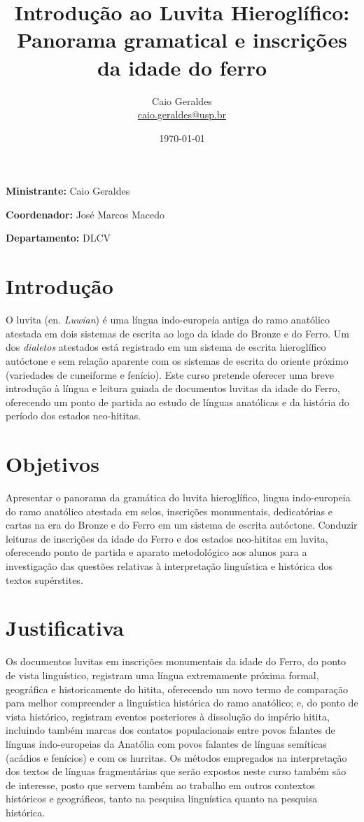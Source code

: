 \documentclass[article,12pt]{memoir}
\title{Introdução ao Luvita Hieroglífico:\\\large Panorama gramatical e inscrições da idade do ferro}
\author{Caio Geraldes\\\url{caio.geraldes@usp.br}}
\date{\today}
\begin{document}
\maketitle

\noindent\textbf{Ministrante:} Caio Geraldes

\noindent\textbf{Coordenador:} José Marcos Macedo

\noindent\textbf{Departamento:} DLCV

\chapter{Introdução}

O luvita (en. \emph{Luwian}) é uma língua indo-europeia antiga do ramo
anatólico atestada em dois sistemas de escrita ao logo da idade do
Bronze e do Ferro. Um dos \emph{dialetos} atestados está registrado em
um sistema de escrita hieroglífico autóctone e sem relação aparente com
os sistemas de escrita do oriente próximo (variedades de cuneiforme e
fenício). Este curso pretende oferecer uma breve introdução à língua e
leitura guiada de documentos luvitas da idade do Ferro, oferecendo um
ponto de partida ao estudo de línguas anatólicas e da história do
período dos estados neo-hititas.

\chapter{Objetivos}

Apresentar o panorama da gramática do luvita hieroglífico, lingua
indo-europeia do ramo anatólico atestada em selos, inscrições
monumentais, dedicatórias e cartas na era do Bronze e do Ferro em um
sistema de escrita autóctone. Conduzir leituras de inscrições da idade
do Ferro e dos estados neo-hititas em luvita, oferecendo ponto de
partida e aparato metodológico aos alunos para a investigação das
questões relativas à interpretação linguística e histórica dos textos
supérstites.

\chapter{Justificativa}

Os documentos luvitas em inscrições monumentais da idade do Ferro, do
ponto de vista linguístico, registram uma língua extremamente próxima
formal, geográfica e historicamente do hitita, oferecendo um novo termo
de comparação para melhor compreender a linguística histórica do ramo
anatólico; e, do ponto de vista histórico, registram eventos posteriores
à dissolução do império hitita, incluindo também marcas dos contatos
populacionais entre povos falantes de línguas indo-europeias da Anatólia
com povos falantes de línguas semíticas (acádios e fenícios) e com os
hurritas. Os métodos empregados na interpretação dos textos de línguas
fragmentárias que serão expostos neste curso também são de interesse,
posto que servem também ao trabalho em outros contextos históricos e
geográficos, tanto na pesquisa linguística quanto na pesquisa histórica.
\end{document}
